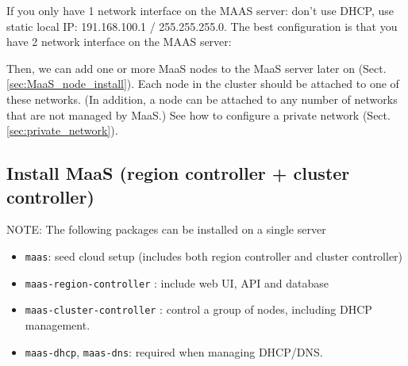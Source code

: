 If you only have 1 network interface on the MAAS server: don't use DHCP, use
static local IP: 191.168.100.1 / 255.255.255.0. The best configuration is that
you have 2 network interface on the MAAS server:


Then, we can add one or more MaaS nodes to the MaaS server later on
(Sect.\ref{sec:MaaS_node_install}). Each node in the cluster should be attached
to one of these networks. (In addition, a node can be attached to any number of
networks that are not managed by MaaS.) See how to configure a private network
(Sect.\ref{sec:private_network}).

%   
%   



% 
\subsection{Install MaaS (region controller + cluster controller)}
\label{sec:MaaS_install_region-controller_and_cluster-controller}

 
NOTE: The following packages can be installed on a single server
\begin{itemize}
  \item \verb!maas!: seed cloud setup (includes both region controller and
  cluster controller)
  \item \verb!maas-region-controller! : include web UI, API and database
  \item \verb!maas-cluster-controller! : control a group of nodes, including
  DHCP management.
  
  \item \verb!maas-dhcp!, \verb!maas-dns!: required when managing DHCP/DNS.
\end{itemize}

